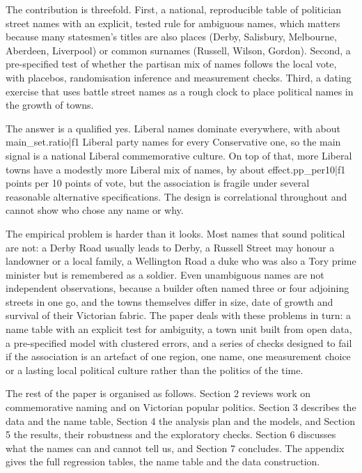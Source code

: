 \documentclass[11pt,a4paper]{article}
\begin{document}
The contribution is threefold. First, a national, reproducible table of politician street names with an explicit, tested rule for ambiguous names, which matters because many statesmen's titles are also places (Derby, Salisbury, Melbourne, Aberdeen, Liverpool) or common surnames (Russell, Wilson, Gordon). Second, a pre-specified test of whether the partisan mix of names follows the local vote, with placebos, randomisation inference and measurement checks. Third, a dating exercise that uses battle street names as a rough clock to place political names in the growth of towns.

The answer is a qualified yes. Liberal names dominate everywhere, with about {{main_set.ratio|f1}} Liberal party names for every Conservative one, so the main signal is a national Liberal commemorative culture. On top of that, more Liberal towns have a modestly more Liberal mix of names, by about {{effect.pp_per10|f1}} points per 10 points of vote, but the association is fragile under several reasonable alternative specifications. The design is correlational throughout and cannot show who chose any name or why.

The empirical problem is harder than it looks. Most names that sound political are not: a Derby Road usually leads to Derby, a Russell Street may honour a landowner or a local family, a Wellington Road a duke who was also a Tory prime minister but is remembered as a soldier. Even unambiguous names are not independent observations, because a builder often named three or four adjoining streets in one go, and the towns themselves differ in size, date of growth and survival of their Victorian fabric. The paper deals with these problems in turn: a name table with an explicit test for ambiguity, a town unit built from open data, a pre-specified model with clustered errors, and a series of checks designed to fail if the association is an artefact of one region, one name, one measurement choice or a lasting local political culture rather than the politics of the time.

The rest of the paper is organised as follows. Section 2 reviews work on commemorative naming and on Victorian popular politics. Section 3 describes the data and the name table, Section 4 the analysis plan and the models, and Section 5 the results, their robustness and the exploratory checks. Section 6 discusses what the names can and cannot tell us, and Section 7 concludes. The appendix gives the full regression tables, the name table and the data construction.
\end{document}
